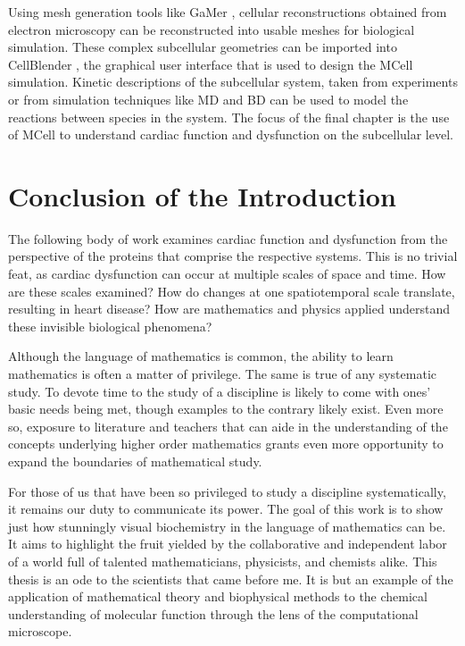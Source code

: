 \documentclass[12pt]{ucsddissertation}
\begin{document}
\begin{dissertationintroduction}
Using mesh generation tools like GaMer \cite{Yu2008, Lee2018}, cellular reconstructions obtained from electron microscopy can be reconstructed into usable meshes for biological simulation. These complex subcellular geometries can be imported into CellBlender \cite{Gupta2018}, the graphical user interface that is used to design the MCell simulation. Kinetic descriptions of the subcellular system, taken from experiments or from simulation techniques like MD and BD can be used to model the reactions between species in the system. The focus of the final chapter is the use of MCell to understand cardiac function and dysfunction on the subcellular level. 

\section{Conclusion of the Introduction}
The following body of work examines cardiac function and dysfunction from the perspective of the proteins that comprise the respective systems. This is no trivial feat, as cardiac dysfunction can occur at multiple scales of space and time. How are these scales examined? How do changes at one spatiotemporal scale translate, resulting in heart disease? How are mathematics and physics applied understand these invisible biological phenomena?

Although the language of mathematics is common, the ability to learn mathematics is often a matter of privilege. The same is true of any systematic study. To devote time to the study of a discipline is likely to come with ones' basic needs being met, though examples to the contrary likely exist. Even more so, exposure to literature and teachers that can aide in the understanding of the concepts underlying higher order mathematics grants even more opportunity to expand the boundaries of mathematical study.

For those of us that have been so privileged to study a discipline systematically, it remains our duty to communicate its power. The goal of this work is to show just how stunningly visual biochemistry in the language of mathematics can be. It aims to highlight the fruit yielded by the collaborative and independent labor of a world full of talented mathematicians, physicists, and chemists alike. This thesis is an ode to the scientists that came before me. It is but an example of the application of mathematical theory and biophysical methods to the chemical understanding of molecular function through the lens of the computational microscope. 
 

 
\end{dissertationintroduction}
\end{document}
